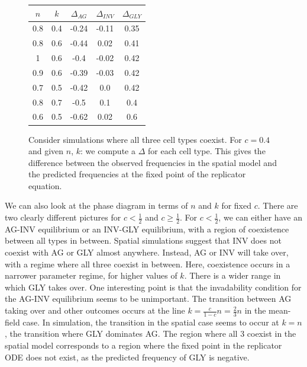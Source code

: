 \documentclass[12pt]{report}
\begin{document}
\begin{figure}[H]
\centering
\begin{tabular}{ | c | c | c | c | c |}
\hline
$n$ & $k$ & $\Delta_{AG}$ & $\Delta_{INV}$ & $\Delta_{GLY}$ \\
\hline
0.8 & 0.4 & -0.24 & -0.11 & 0.35 \\
\hline
0.8 & 0.6 & -0.44 & 0.02 & 0.41\\ 
\hline
1 &  0.6 & -0.4 & -0.02 & 0.42 \\
\hline
0.9 & 0.6 & -0.39 & -0.03 & 0.42 \\
\hline
0.7 & 0.5 & -0.42 & 0.0 & 0.42 \\ 
\hline
0.8 & 0.7 & -0.5 & 0.1 & 0.4 \\ 
\hline
0.6 & 0.5 & -0.62 & 0.02 & 0.6 \\ 
\hline
\end{tabular}
\caption{Consider simulations where  all three cell types coexist. For $c = 0.4$ and given $n$, $k$: we compute a $\Delta$ for each cell type. This gives the difference between the observed frequencies in the spatial model and the predicted frequencies at the fixed point of the replicator equation.}
\end{figure}

We can also look at the phase diagram in terms of $n$ and $k$ for fixed $c$. There are two clearly different pictures for $c < \frac{1}{2}$ and $c \ge \frac{1}{2}$.  For $c < \frac{1}{2}$, we can either have an AG-INV equilibrium or an INV-GLY equilibrium, with a region of coexistence between all types in between. Spatial simulations suggest that INV does not coexist with AG or GLY almost anywhere. Instead, AG or INV will take over, with a regime where all three coexist in between. Here, coexistence occurs in a narrower parameter regime, for higher values of $k$. There is a wider range in which GLY takes over. One interesting point is that the invadability condition for the AG-INV equilibrium seems to be unimportant. The transition between AG taking over and other outcomes occurs at the line $k = \frac{c}{1-c} n = \frac{2}{3} n$ in the mean-field case. In simulation, the transition in the spatial case seems to occur at $k  = n$, the transition where GLY dominates AG. The region where all 3 coexist in the spatial model corresponds to a region where the fixed point in the replicator ODE does not exist, as the predicted frequency of GLY is negative.
\end{document}
